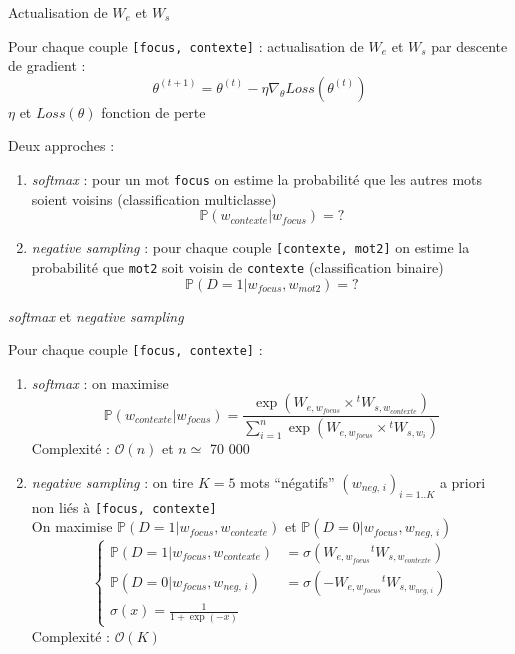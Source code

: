 \documentclass[10pt,xcolor=table,color={dvipsnames,usenames},ignorenonframetext,usepdftitle=false,french]{beamer}
\providecommand{\tightlist}{%
  \setlength{\parskip}{0pt}
  }
\begin{document}
\begin{frame}[fragile]{Actualisation de \(W_e\) et \(W_s\)}
\protect\hypertarget{actualisation-de-w_e-et-w_s}{}

Pour chaque couple \texttt{{[}focus,\ contexte{]}} : actualisation de
\(W_e\) et \(W_s\) par descente de gradient : \[
\theta^{(t+1)} = \theta^{(t)} - \eta \nabla_\theta Loss(\theta^{(t)})
\] \(\eta\)  et \(Loss(\theta)\)
fonction de perte

\pause

Deux approches :

\begin{enumerate}
\tightlist
\item
  \emph{softmax} : pour un mot \texttt{focus} on estime la probabilité
  que les autres mots soient voisins (classification multiclasse) \[
  \mathbb P(w_{contexte}\vert w_{focus}) = ?
  \] \pause
\item
  \emph{negative sampling} : pour chaque couple
  \texttt{{[}contexte,\ mot2{]}} on estime la probabilité que
  \texttt{mot2} soit voisin de \texttt{contexte} (classification
  binaire) \[
  \mathbb P(D=1\vert w_{focus},w_{mot2}) = ?
  \]
\end{enumerate}

\end{frame}

\begin{frame}[fragile]{\emph{softmax} et \emph{negative sampling}}
\protect\hypertarget{softmax-et-negative-sampling-1}{}

Pour chaque couple \texttt{{[}focus,\ contexte{]}} :

\begin{enumerate}
\item
  \emph{softmax} : on maximise \[
  \mathbb P(w_{contexte}\vert w_{focus}) = 
  \frac{
  \exp(W_{e,w_{focus}}\times {}^tW_{s,w_{contexte}})
  }{
  \sum_{i=1}^n\exp(W_{e,w_{focus}}\times {}^tW_{s,w_{i}})
  }
  \] \bcsmmh Complexité : \(\mathcal O (n)\) et \(n\simeq\) 70 000
  \pause
\item
  \emph{negative sampling} : on tire \(K=5\) mots ``négatifs''
  \((w_{neg,\,i})_{i=1..K}\) a priori non liés à
  \texttt{{[}focus,\ contexte{]}}\\
  On maximise \(\mathbb P(D=1\vert w_{focus},w_{contexte})\) et
  \(\mathbb P(D=0\vert w_{focus},w_{neg,\,i})\) \[
  \begin{cases}
  \mathbb P(D=1\vert w_{focus},w_{contexte})&=\sigma(W_{e,w_{focus}}{}^tW_{s,w_{contexte}})  \\
  \mathbb P(D=0\vert w_{focus},w_{neg,\,i})&=\sigma(-W_{e,w_{focus}}{}^tW_{s,w_{neg,\,i}}) 
  \\\sigma(x)=\frac{1}{1+\exp(-x)}
  \end{cases}
  \] \bcsmbh Complexité : \(\mathcal O (K)\)
\end{enumerate}

\end{frame}
\end{document}
